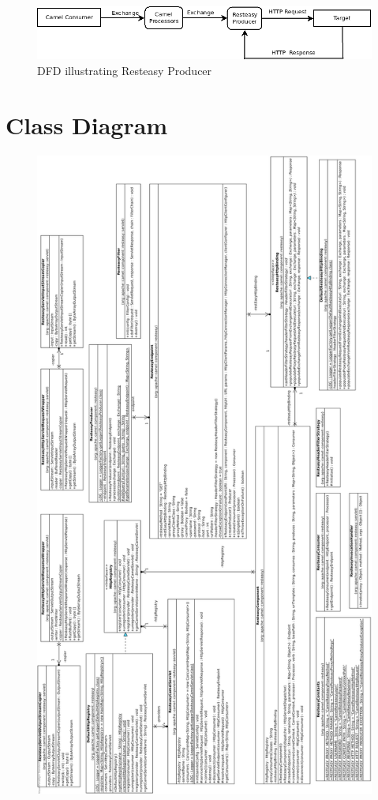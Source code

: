\documentclass[12pt,final,oneside]{fithesis2}
\begin{document}
\begin{figure}[h]
\advance\leftskip-1cm
\includegraphics[width=1.1\linewidth]{diagrams/producer.png}
\caption{DFD illustrating Resteasy Producer}
\label{dfd-prod}
\end{figure}

\section{Class Diagram}\label{class-dia}
\begin{figure}[H]
\centering
\includegraphics[width=0.78\linewidth]{diagrams/class2.png}

\end{figure}
\end{document}
